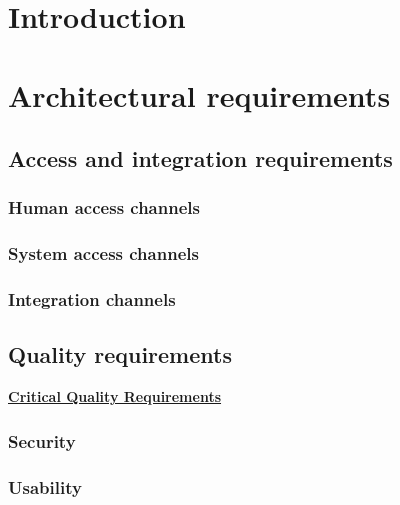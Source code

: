 \documentclass[a4paper,12pt,titlepage]{article}
\begin{document}


\tableofcontents
\newpage

\section{Introduction}

\section{Architectural requirements}
	
	\subsection{Access and integration requirements}
			\subsubsection{Human access channels}	
				
			\subsubsection{System access channels}
					
			\subsubsection{Integration channels}
				
 	\subsection{Quality requirements}
 	
		\underline{\textbf{Critical Quality Requirements}}
		\subsubsection{Security}
			
			
		\subsubsection{Usability}
			
			
\end{document}
